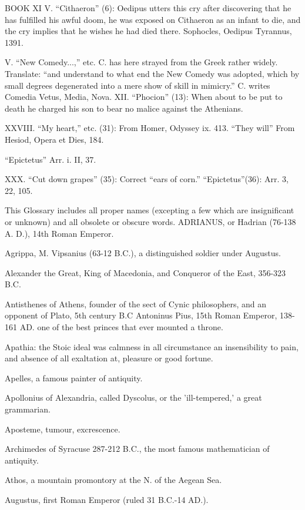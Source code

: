 BOOK XI V. ``Cithaeron'' (6): Oedipus utters this cry after discovering that
he has fulfilled his awful doom, he was exposed on Cithaeron as an infant
to die, and the cry implies that he wishes he had died there. Sophocles,
Oedipus Tyrannus, 1391.

V. ``New Comedy...,'' etc. C. has here strayed from the Greek rather widely.
Translate: ``and understand to what end the New Comedy was adopted, which
by small degrees degenerated into a mere show of skill in mimicry.'' C.
writes Comedia Vetus, Media, Nova. XII. ``Phocion'' (13): When about to be
put to death he charged his son to bear no malice against the Athenians.

XXVIII. ``My heart,'' etc. (31): From Homer, Odyssey ix. 413. ``They will''
From Hesiod, Opera et Dies, 184.

``Epictetus'' Arr. i. II, 37.

XXX. ``Cut down grapes'' (35): Correct ``ears of corn.'' ``Epictetus''(36): Arr.
3, 22, 105.


This Glossary includes all proper names (excepting a few which are
insignificant or unknown) and all obsolete or obscure words. ADRIANUS, or
Hadrian (76-138 A. D.), 14th Roman Emperor.

Agrippa, M. Vipsanius (63-12 B.C.), a distinguished soldier under
Augustus.

Alexander the Great, King of Macedonia, and Conqueror of the East, 356-323
B.C.

Antisthenes of Athens, founder of the sect of Cynic philosophers, and an
opponent of Plato, 5th century B.C Antoninus Pius, 15th Roman Emperor,
138-161 AD. one of the best princes that ever mounted a throne.

Apathia: the Stoic ideal was calmness in all circumstance an insensibility
to pain, and absence of all exaltation at, pleasure or good fortune.

Apelles, a famous painter of antiquity.

Apollonius of Alexandria, called Dyscolus, or the 'ill-tempered,' a great
grammarian.

Aposteme, tumour, excrescence.

Archimedes of Syracuse 287-212 B.C., the most famous mathematician of
antiquity.

Athos, a mountain promontory at the N. of the Aegean Sea.

Augustus, first Roman Emperor (ruled 31 B.C.-14 AD.).

